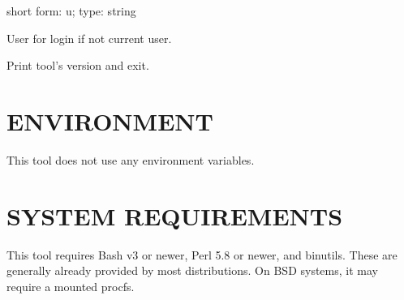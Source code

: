 \documentclass[letterpaper,10pt,english]{sphinxmanual}
\begin{document}

\begin{fulllineitems}
\label{\detokenize{mariadb-database-summary:cmdoption-mariadb-database-summary-user}}
\sphinxAtStartPar
short form: \sphinxhyphen{}u; type: string

\sphinxAtStartPar
User for login if not current user.

\end{fulllineitems}


\begin{fulllineitems}
\label{\detokenize{mariadb-database-summary:cmdoption-mariadb-database-summary-version}}
\sphinxAtStartPar
Print tool’s version and exit.

\end{fulllineitems}



\section{ENVIRONMENT}
\label{\detokenize{mariadb-database-summary:environment}}
\sphinxAtStartPar
This tool does not use any environment variables.


\section{SYSTEM REQUIREMENTS}
\label{\detokenize{mariadb-database-summary:system-requirements}}
\sphinxAtStartPar
This tool requires Bash v3 or newer, Perl 5.8 or newer, and binutils.
These are generally already provided by most distributions.
On BSD systems, it may require a mounted procfs.
\end{document}
